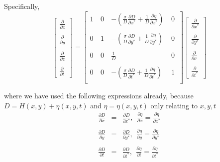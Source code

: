 \documentclass[oribibl]{llncs}
\begin{document}
Specifically,
\begin{equation}      
\left[                 
  \begin{array}{c}  
    \frac{\partial}{\partial x}  \\  \nonumber \\ 
    \frac{\partial}{\partial y}  \\ \nonumber \\ 
    \frac{\partial}{\partial z}  \\ \nonumber \\ 
    \frac{\partial}{\partial t} 
  \end{array}
\right]
=  
\left[             
  \begin{array}{cccc}  
   1\  & 0\ & -\left( \frac{\sigma}{D} \frac{\partial D}{\partial x^*} + \frac{1}{D}\frac{\partial \eta}{\partial x^*} \right)\ & 0\ \\   \nonumber \\ 
   0\  & 1\ & -\left(\frac{\sigma}{D} \frac{\partial D}{\partial y^*} + \frac{1}{D}\frac{\partial \eta}{\partial y^*} \right)\ & 0\ \\   \nonumber \\ 
   0\  & 0\ & \frac{1}{D} \													        & 0 \ \\   \nonumber \\ 
   0\  & 0\ & -\left(\frac{\sigma}{D} \frac{\partial D}{\partial t^*} + \frac{1}{D}\frac{\partial \eta}{\partial t^*} \right)\   & 1\ \\  
  \end{array}
\right]              
\left[                 
  \begin{array}{c}  
    \frac{\partial}{\partial x^*}  \\  \nonumber \\ 
    \frac{\partial}{\partial y^*}  \\ \nonumber \\ 
    \frac{\partial}{\partial \sigma}  \\ \nonumber \\ 
    \frac{\partial}{\partial t^*} 
  \end{array}
\right]
\end{equation}

where we have used the following expressions already, because $D = H(x,y) + \eta (x,y,t)$ and $\eta = \eta (x,y,t)$ only relating to $x,y,t$
\begin{eqnarray}
  \frac{\partial D}{\partial x}&=&\frac{\partial D}{\partial x^*},\ \ \frac{\partial \eta}{\partial x} = \frac{\partial \eta}{\partial x^*} 
  \nonumber \\
  \nonumber \\
  \frac{\partial D}{\partial y}&=&\frac{\partial D}{\partial y^*},\ \ \frac{\partial \eta}{\partial y} = \frac{\partial \eta}{\partial y^*}
  \nonumber \\
  \nonumber \\
  \frac{\partial D}{\partial t}&=&\frac{\partial D}{\partial t^*},\ \ \frac{\partial \eta}{\partial t} = \frac{\partial \eta}{\partial t^*}
  \nonumber \\
  \nonumber 
\end{eqnarray}
\end{document}
